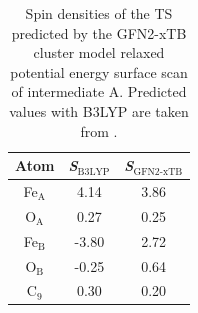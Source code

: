 \begin{table}[htbp]
\caption{Spin densities of the TS predicted by the GFN2-xTB cluster model relaxed potential energy surface scan of intermediate A. Predicted values with B3LYP are taken from \cite{Yu2019}.}
\centering
\begin{tabular}{@{}ccc@{}}
\toprule
\textbf{Atom} & \textbf{\textit{S}$_\text{B3LYP}$} & \textbf{\textit{S}$_\text{GFN2-xTB}$} \\ \midrule
Fe$_{\text{A}}$           & 4.14            & 3.86               \\ \midrule
O$_{\text{A}}$             & 0.27            & 0.25               \\ \midrule
Fe$_{\text{B}}$            & -3.80           & 2.72               \\ \midrule
O$_{\text{B}}$             & -0.25           & 0.64               \\ \midrule
C$_{\text{9}}$             & 0.30            & 0.20               \\ \bottomrule
\end{tabular}
\label{tab:xtb_spin}
\end{table}

